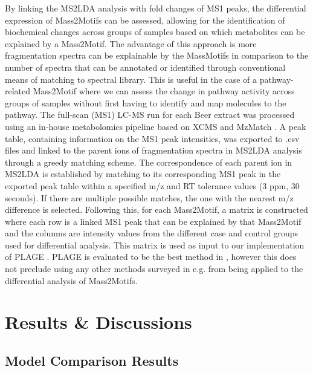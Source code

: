 By linking the MS2LDA analysis with fold changes of MS1 peaks, the differential expression of Mass2Motifs can be assessed, allowing for the identification of biochemical changes across groups of samples based on which metabolites can be explained by a Mass2Motif. The advantage of this approach is more fragmentation spectra can be explainable by the MassMotifs in comparison to the number of spectra that can be annotated or identified through conventional means of matching to spectral library. This is useful in the case of a pathway-related Mass2Motif where we can assess the change in pathway activity across groups of samples without first having to identify and map molecules to the pathway. The full-scan (MS1) LC-MS run for each Beer extract was processed using an in-house metabolomics pipeline based on XCMS \cite{Smith2006} and MzMatch \cite{Scheltema2011}. A peak table, containing information on the MS1 peak intensities, was exported to .csv files and linked to the parent ions of fragmentation spectra in MS2LDA analysis through a greedy matching scheme. The correspondence of each parent ion in MS2LDA is established by matching to its corresponding MS1 peak in the exported peak table within a specified m/z and RT tolerance values (3 ppm, 30 seconds). If there are multiple possible matches, the one with the nearest m/z difference is selected. Following this, for each Mass2Motif, a matrix is constructed where each row is a linked MS1 peak that can be explained by that Mass2Motif and the columns are intensity values from the different case and control groups used for differential analysis. This matrix is used as input to our implementation of PLAGE \cite{tomfohr2005pathway}. PLAGE is evaluated to be the best method in \cite{tarca2013comparison}, however this does not preclude using any other methods surveyed in e.g. \cite{tarca2013comparison} from being applied to the differential analysis of Mass2Motifs.

\section{Results \& Discussions}

\subsection{Model Comparison Results\label{sub:lda-model-comparison}}

